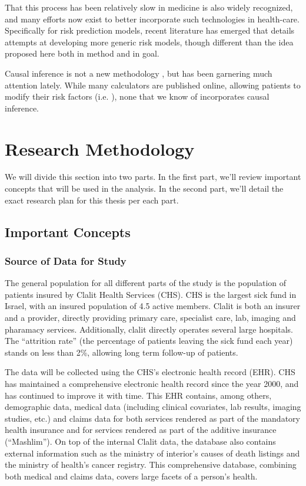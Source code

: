 \documentclass[a4paper,12pt]{article}
\begin{document}
	That this process has been relatively slow in medicine is also widely recognized, and many efforts now exist to better incorporate such technologies in health-care\cite{Obermeyer2016}. Specifically for risk prediction models, recent literature has emerged that details attempts at developing more generic risk models, though different than the idea proposed here both in method and in goal\cite{Rajkomar2018}.
	
	Causal inference is not a new methodology \cite{GuidoWImbens2015,StephenL.Morgan2015}, but has been garnering much attention lately\cite{JudeaPearl2018}. While many calculators are published online, allowing patients to modify their risk factors (i.e. \cite{NHS2016}), none that we know of incorporates causal inference.
	
	\section{Research Methodology}
	We will divide this section into two parts. In the first part, we'll review important concepts that will be used in the analysis. In the second part, we'll detail the exact research plan for this thesis per each part.
	
	\subsection{Important Concepts}
	
		\subsubsection{Source of Data for Study}
		The general population for all different parts of the study is the population of patients insured by Clalit Health Services (CHS). CHS is the largest sick fund in Israel, with an insured population of 4.5 active members. Clalit is both an insurer and a provider, directly providing primary care, specialist care, lab, imaging and pharamacy services. Additionally, clalit directly operates several large hospitals. The “attrition rate” (the percentage of patients leaving the sick fund each year) stands on less than 2\%, allowing long term follow-up of patients.
		
		The data will be collected using the CHS's electronic health record (EHR). CHS has maintained a comprehensive electronic health record since the year 2000, and has continued to improve it with time. This EHR contains, among others, demographic data, medical data (including clinical covariates, lab results, imaging studies, etc.) and claims data for both services rendered as part of the mandatory health insurance and for services rendered as part of the additive insurance (“Mashlim”). On top of the internal Clalit data, the database also contains external information such as the ministry of interior's causes of death listings and the ministry of health's cancer registry. This comprehensive database, combining both medical and claims data, covers large facets of a person's health.
		
\end{document}

